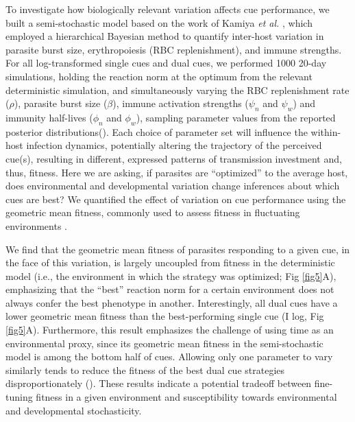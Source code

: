 \documentclass[10pt,letterpaper]{article}
\begin{document}
To investigate how biologically relevant variation affects cue performance, we built a semi-stochastic model based on the work of Kamiya \emph{et al.} \cite{kamiya_uncovering_2020}, which employed a hierarchical Bayesian method to quantify inter-host variation in parasite burst size, erythropoiesis (RBC replenishment), and immune strengths. For all log-transformed single cues and dual cues, we performed 1000 20-day simulations, holding the reaction norm at the optimum from the relevant deterministic simulation, and simultaneously varying the RBC replenishment rate ($\rho$), parasite burst size ($\beta$), immune activation strengths ($\psi_{n}$ and $\psi_{w}$) and immunity half-lives ($\phi_{n}$ and $\phi_{w}$), sampling parameter values from the reported posterior distributions\cite{kamiya_uncovering_2020}(). Each choice of parameter set will influence the within-host infection dynamics, potentially altering the trajectory of the perceived cue(s), resulting in different, expressed patterns of transmission investment and, thus, fitness. Here we are asking, if parasites are ``optimized'' to the average host, does environmental and developmental variation change inferences about which cues are best? We quantified the effect of variation on cue performance using the geometric mean fitness, commonly used to assess fitness in fluctuating environments \cite{lewontin_population_1969, gillespie_polymorphism_1973}. \newline

We find that the geometric mean fitness of parasites responding to a given cue, in the face of this variation, is largely uncoupled from fitness in the deterministic model (i.e., the environment in which the strategy was optimized; Fig \ref{fig5}A), emphasizing that the ``best'' reaction norm for a certain environment does not always confer the best phenotype in another. Interestingly, all dual cues have a lower geometric mean fitness than the best-performing single cue (I log, Fig \ref{fig5}A). Furthermore, this result emphasizes the challenge of using time as an environmental proxy, since its geometric mean fitness in the semi-stochastic model is among the bottom half of cues. Allowing only one parameter to vary similarly tends to reduce the fitness of the best dual cue strategies disproportionately  (). These results indicate a potential tradeoff between fine-tuning fitness in a given environment and susceptibility towards environmental and developmental stochasticity.\newline
\end{document}
